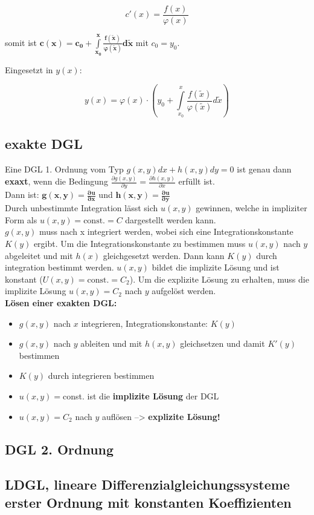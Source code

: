 \[c'(x)=\frac{f(x)}{\varphi(x)}\]

somit ist $\bm{c(x) = c_0 + \int\limits_{x_0}^x\frac{f(\tilde{x})}{\varphi(\tilde{x})}d\tilde{x}}$ mit $c_0 = y_0$. 

Eingesetzt in $y(x)$:

\[
    y(x) = \varphi(x) \cdot \left( y_0+\int\limits_{x_0}^x\frac{f(\tilde{x})}{\varphi(\tilde{x})}d\tilde{x}\right)
\]

\subsection{exakte DGL}
Eine DGL 1. Ordnung vom Typ $g(x,y)dx + h(x,y)dy = 0$ ist genau dann \textbf{exaxt}, wenn die Bedingung $\frac{\partial g(x,y)}{\partial y} = \frac{\partial h (x,y)}{\partial x}$ erfüllt ist.\\

Dann ist: $\bm{g(x,y) = \frac{\partial u}{ \partial x}}$ und $\bm{h(x,y) = \frac{\partial u}{ \partial y}}$\\

Durch unbestimmte Integration lässt sich $u(x,y)$ gewinnen, welche in impliziter Form als $u(x,y) = \text{const.} = C$ dargestellt werden kann.\\

$g(x,y)$ muss nach x integriert werden, wobei sich eine Integrationskonstante $K(y)$ ergibt. Um die Integrationskonstante zu bestimmen muss $u(x,y)$ nach $y$ abgeleitet und mit $h(x)$ gleichgesetzt werden. Dann kann $K(y)$ durch integration bestimmt werden. $u(x,y)$ bildet die implizite Lösung und ist konstant ($U(x,y) = \text{const.} = C_2$). Um die explizite Lösung zu erhalten, muss die implizite Lösung $u(x,y) = C_2$ nach $y$ aufgelöst werden.\\

\textbf{Lösen einer exakten DGL:}
\begin{itemize}
    \item $g(x,y)$ nach $x$ integrieren, Integrationskonstante: $K(y)$
    \item $g(x,y)$ nach $y$ ableiten und mit $h(x,y)$ gleichsetzen und damit $K'(y)$ bestimmen
    \item $K(y)$ durch integrieren bestimmen
    \item $u(x,y) = $const. ist die \textbf{implizite Lösung} der DGL
    \item $u(x,y) = C_2$ nach $y$ auflösen --> \textbf{explizite Lösung!}
\end{itemize}

\subsection{DGL 2. Ordnung}


\subsection{LDGL, lineare Differenzialgleichungssysteme erster Ordnung mit konstanten Koeffizienten}







